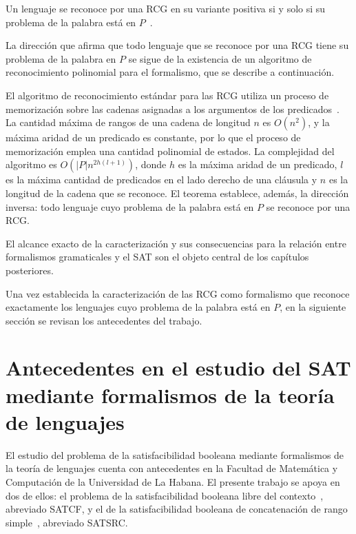 \begin{teorema}
\label{teo:prcg-ptime}
Un lenguaje se reconoce por una RCG en su variante positiva si y solo
si su problema de la palabra está en
$P$~\cite{bertsch2001rcg, boullier2000range}.
\end{teorema}

La dirección que afirma
que todo lenguaje que se reconoce por una RCG tiene su problema de la
palabra en $P$ se sigue de la existencia de un algoritmo de
reconocimiento polinomial para el formalismo, que se describe a
continuación.

El algoritmo de reconocimiento estándar para las RCG utiliza un proceso
de memorización sobre las cadenas asignadas a los argumentos de los
predicados~\cite{boullier1998proposal}. La cantidad máxima de rangos de
una cadena de longitud $n$ es $O(n^2)$, y la máxima aridad de un predicado
es constante, por lo que el proceso de memorización emplea una cantidad
polinomial de estados. La complejidad del algoritmo es $O(|P|
n^{2h(l+1)})$, donde $h$ es la máxima aridad de un predicado, $l$ es
la máxima cantidad de predicados en el lado derecho de una cláusula y
$n$ es la longitud de la cadena que se reconoce. El teorema establece,
además, la dirección inversa: todo lenguaje cuyo problema de la palabra
está en $P$ se reconoce por una RCG.

El alcance exacto
de la caracterización y sus consecuencias para la relación entre
formalismos gramaticales y el SAT son el objeto
central de los capítulos posteriores.

Una vez establecida la caracterización de las RCG como formalismo que
reconoce exactamente los lenguajes cuyo problema de la palabra está en
$P$, en la siguiente sección se revisan los antecedentes del trabajo.

\section{Antecedentes en el estudio del SAT mediante formalismos de la teoría de lenguajes}
\label{sec:antecedentes}

El estudio del problema de la satisfacibilidad booleana mediante
formalismos de la teoría de lenguajes cuenta con antecedentes en la
Facultad de Matemática y Computación de la Universidad de La Habana. El
presente trabajo se apoya en dos de ellos: el problema de la
satisfacibilidad booleana libre del contexto~\cite{fernandezarias2007},
abreviado SATCF, y el de la satisfacibilidad booleana de concatenación
de rango simple~\cite{aguileralopez2016}, abreviado SATSRC.

